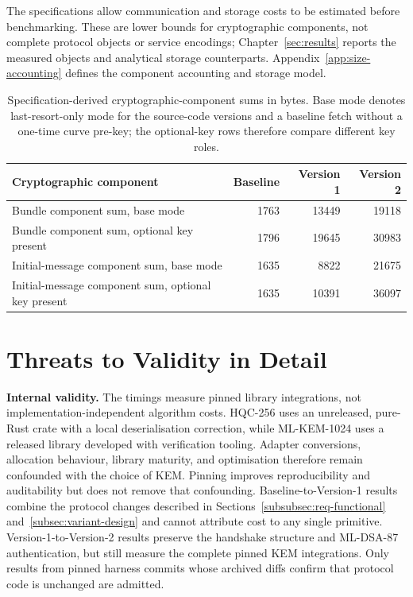 The specifications allow communication and storage costs to be estimated before benchmarking. These are lower bounds for cryptographic components, not complete protocol objects or service encodings; Chapter~\ref{sec:results} reports the measured objects and analytical storage counterparts. Appendix~\ref{app:size-accounting} defines the component accounting and storage model.

\begin{table}[htbp]
    \centering
    \caption{
        Specification-derived cryptographic-component sums in bytes. Base mode denotes last-resort-only mode for the source-code versions and a baseline fetch without a one-time curve pre-key; the optional-key rows therefore compare different key roles.
    }
    \label{tab:spec-sizes}
    \begin{tabular}{lrrr}
        \hline
            Cryptographic component & Baseline & Version 1 & Version 2 \\
        \hline

            Bundle component sum, base mode & 1763 & 13449 & 19118 \\
        Bundle component sum, optional key present & 1796 & 19645 & 30983 \\
        Initial-message component sum, base mode & 1635 & 8822 & 21675 \\
        Initial-message component sum, optional key present & 1635 & 10391 & 36097 \\
        \hline
    \end{tabular}
\end{table}

\section{Threats to Validity in Detail}
\label{app:threats-detail}

\textbf{Internal validity.} The timings measure pinned library integrations, not implementation-independent algorithm costs. HQC-256 uses an unreleased, pure-Rust crate with a local deserialisation correction, while ML-KEM-1024 uses a released library developed with verification tooling. Adapter conversions, allocation behaviour, library maturity, and optimisation therefore remain confounded with the choice of KEM. Pinning improves reproducibility and auditability but does not remove that confounding. Baseline-to-Version-1 results combine the protocol changes described in Sections~\ref{subsubsec:req-functional} and~\ref{subsec:variant-design} and cannot attribute cost to any single primitive. Version-1-to-Version-2 results preserve the handshake structure and ML-DSA-87 authentication, but still measure the complete pinned KEM integrations. Only results from pinned harness commits whose archived diffs confirm that protocol code is unchanged are admitted.

